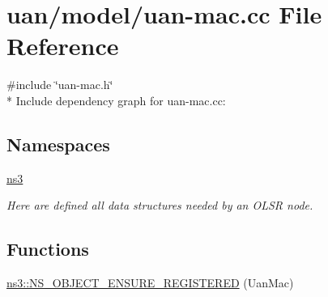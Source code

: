 \hypertarget{uan-mac_8cc}{}\section{uan/model/uan-\/mac.cc File Reference}
\label{uan-mac_8cc}
{\ttfamily \#include \char`\"{}uan-\/mac.\+h\char`\"{}}\\*
Include dependency graph for uan-\/mac.cc\+:
\subsection*{Namespaces}
\begin{DoxyCompactItemize}
\item 
 \hyperlink{namespacens3}{ns3}
\begin{DoxyCompactList}\small\item\em Here are defined all data structures needed by an O\+L\+SR node. \end{DoxyCompactList}\end{DoxyCompactItemize}
\subsection*{Functions}
\begin{DoxyCompactItemize}
\item 
\hyperlink{namespacens3_a81e991ff99b1915c2f54e702967ed564}{ns3\+::\+N\+S\+\_\+\+O\+B\+J\+E\+C\+T\+\_\+\+E\+N\+S\+U\+R\+E\+\_\+\+R\+E\+G\+I\+S\+T\+E\+R\+ED} (Uan\+Mac)
\end{DoxyCompactItemize}
